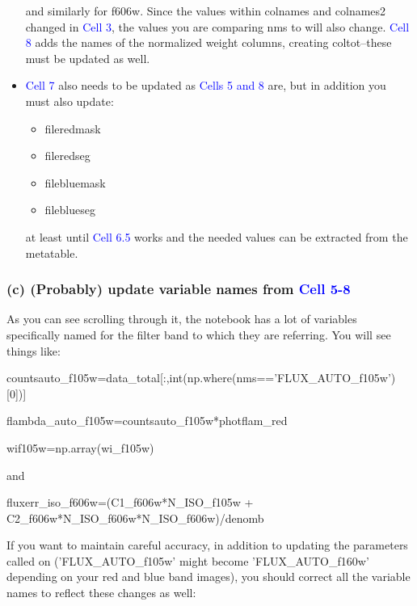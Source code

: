 \documentclass[a4paper,10pt]{article}
\begin{document}
\begin{itemize}
and similarly for f606w. Since the values within colnames and colnames2 changed in \textcolor{blue}{Cell 3}, the values you are comparing nms to will also change. \textcolor{blue}{Cell 8} adds the names of the normalized weight columns, creating coltot--these must be updated as well.

    \item
    \textcolor{blue}{Cell 7} also needs to be updated as \textcolor{blue}{Cells 5 and 8} are, but in addition you must also update:
    \begin{itemize}
     \item fileredmask
     \item fileredseg
     \item filebluemask
     \item fileblueseg
    \end{itemize}
    at least until \textcolor{blue}{Cell 6.5} works and the needed values can be extracted from the metatable.

\end{itemize}



\subsubsection{(c) (Probably) update variable names from \textcolor{blue}{Cell 5-8}}

As you can see scrolling through it, the notebook has a lot of variables specifically named for the filter band to which they are referring. You will see things like:\\

\centerline{countsauto\_f105w=data\_total[:,int(np.where(nms=='FLUX\_AUTO\_f105w')[0])]}

\centerline{flambda\_auto\_f105w=countsauto\_f105w*photflam\_red}

\centerline{wif105w=np.array(wi\_f105w)}

\centerline{and}

\centerline{fluxerr\_iso\_f606w=(C1\_f606w*N\_ISO\_f105w + C2\_f606w*N\_ISO\_f606w*N\_ISO\_f606w)/denomb}

\hfill \break
\noindent If you want to maintain careful accuracy, in addition to updating the parameters called on ('FLUX\_AUTO\_f105w' might become 'FLUX\_AUTO\_f160w' depending on your red and blue band images), you should correct all the variable names to reflect these changes as well:\\
\end{document}
